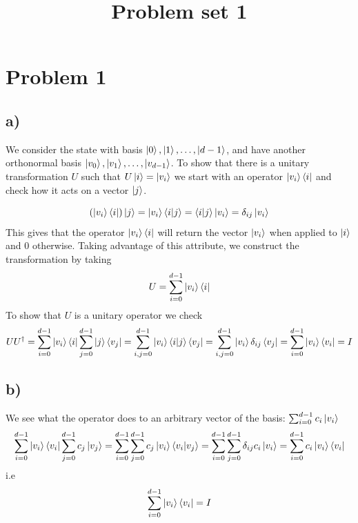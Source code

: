 \documentclass[11pt,a4paper]{article}
\begin{document}
\title{Problem set 1}
\section*{Problem 1}
\subsection*{a)}
We consider the state with basis $\ket{0}, \ket{1},\dots ,\ket{d-1}$, and have another orthonormal basis $\ket{v_0}, \ket{v_1}, \dots , \ket{v_{d-1}}$. To show that there is a unitary transformation $U$ such that $U\ket{i}=\ket{v_i}$ we start with an operator $\ket{v_i}\bra{i}$ and check how it acts on a vector $\ket{j}$.

\begin{equation}
    \left(\ket{v_i}\bra{i}\right) \ket{j} = \ket{v_i} \braket{i|j} = \braket{i|j}\ket{v_i} = \delta_{ij}\ket{v_i} 
\end{equation}
This gives that the operator $\ket{v_i}\bra{i}$ will return the vector $\ket{v_i}$ when applied to $\ket{i}$ and $0$ otherwise. Taking advantage of this attribute, we construct the transformation by taking 
\begin{equation}
    U = \sum_{i=0}^{d-1}\ket{v_i}\bra{i}
\end{equation}
To show that $U$ is a unitary operator we check 
\begin{equation*}
    UU^\dagger = \sum_{i=0}^{d-1}\ket{v_i}\bra{i}\sum_{j=0}^{d-1}\ket{j}\bra{v_j} = 
    \sum_{i,j=0}^{d-1}\ket{v_i}\braket{i|j}\bra{v_j} = 
    \sum_{i,j=0}^{d-1}\ket{v_i}\delta_{ij}\bra{v_j} = 
    \sum_{i=0}^{d-1}\ket{v_i}\bra{v_i} = I
\end{equation*}
\subsection*{b)}
We see what the operator does to an arbitrary vector of the basis: $\sum_{i=0}^{d-1}c_{i}\ket{v_i}$
\begin{equation}
    \sum_{i=0}^{d-1}\ket{v_i}\bra{v_i}\sum_{j=0}^{d-1}c_{j}\ket{v_j} = 
    \sum_{i=0}^{d-1}\sum_{j=0}^{d-1}c_{j}\ket{v_i}\braket{v_i|v_j} = 
    \sum_{i=0}^{d-1}\sum_{j=0}^{d-1}\delta_{ij}c_i\ket{v_i} = 
    \sum_{i=0}^{d-1}c_{i}\ket{v_i}\bra{v_i}
\end{equation}
i.e 
\begin{equation}
    \sum_{i=0}^{d-1}\ket{v_i}\bra{v_i} = I
\end{equation}
\end{document}
